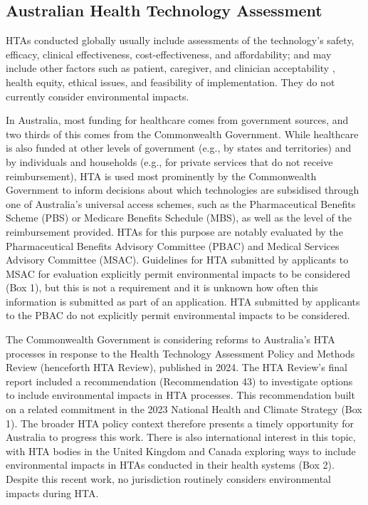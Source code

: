 \begin{refsection}
\section{Australian Health Technology Assessment}
HTAs conducted globally usually include assessments of the technology’s safety, efficacy, clinical effectiveness, cost-effectiveness, and affordability; and may include other factors such as patient, caregiver, and clinician acceptability , health equity, ethical issues, and feasibility of implementation.\cite{world_health_organization_2015_2015} They do not currently consider environmental impacts. 

In Australia, most funding for healthcare comes from government sources, and two thirds of this comes from the Commonwealth Government.\cite{australian_institute_of_health_and_welfare_health_2024} While healthcare is also funded at other levels of government (e.g., by states and territories) and by individuals and households (e.g., for private services that do not receive reimbursement), HTA is used most prominently by the Commonwealth Government to inform decisions about which technologies are subsidised through one of Australia’s universal access schemes, such as the Pharmaceutical Benefits Scheme (PBS) or Medicare Benefits Schedule (MBS), as well as the level of the reimbursement provided. HTAs for this purpose are notably evaluated by the Pharmaceutical Benefits Advisory Committee (PBAC) and Medical Services Advisory Committee (MSAC). Guidelines for HTA submitted by applicants to MSAC for evaluation explicitly permit environmental impacts to be considered (Box 1),\cite{australian_government_department_of_health_disability_and_ageing_guidelines_2021} but this is not a requirement and it is unknown how often this information is submitted as part of an application. HTA submitted by applicants to the PBAC do not explicitly permit environmental impacts to be considered.\cite{australian_government_department_of_health_disability_and_ageing_guidelines_2016}

The Commonwealth Government is considering reforms to Australia’s HTA processes in response to the Health Technology Assessment Policy and Methods Review (henceforth HTA Review), published in 2024.\cite{australian_government_department_of_health_and_aged_care_health_2024} The HTA Review’s final report included a recommendation (Recommendation 43) to investigate options to include environmental impacts in HTA processes. This recommendation built on a related commitment in the 2023 National Health and Climate Strategy (Box 1).\cite{australian_government_department_of_health_and_aged_care_national_2023} The broader HTA policy context therefore presents a timely opportunity for Australia to progress this work. There is also international interest in this topic, with HTA bodies in the United Kingdom and Canada exploring ways to include environmental impacts in HTAs conducted in their health systems (Box 2). Despite this recent work, no jurisdiction routinely considers environmental impacts during HTA. 


\end{refsection}
